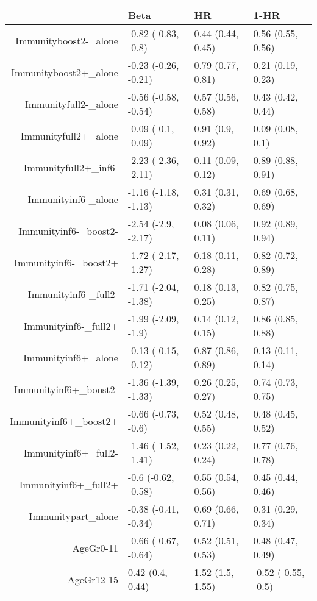 \begin{table}[ht]
\centering
\begin{tabular}{rlll}
  \hline
 & Beta & HR & 1-HR \\ 
  \hline
Immunityboost2-\_alone & -0.82 (-0.83, -0.8) & 0.44 (0.44, 0.45) & 0.56 (0.55, 0.56) \\ 
  Immunityboost2+\_alone & -0.23 (-0.26, -0.21) & 0.79 (0.77, 0.81) & 0.21 (0.19, 0.23) \\ 
  Immunityfull2-\_alone & -0.56 (-0.58, -0.54) & 0.57 (0.56, 0.58) & 0.43 (0.42, 0.44) \\ 
  Immunityfull2+\_alone & -0.09 (-0.1, -0.09) & 0.91 (0.9, 0.92) & 0.09 (0.08, 0.1) \\ 
  Immunityfull2+\_inf6- & -2.23 (-2.36, -2.11) & 0.11 (0.09, 0.12) & 0.89 (0.88, 0.91) \\ 
  Immunityinf6-\_alone & -1.16 (-1.18, -1.13) & 0.31 (0.31, 0.32) & 0.69 (0.68, 0.69) \\ 
  Immunityinf6-\_boost2- & -2.54 (-2.9, -2.17) & 0.08 (0.06, 0.11) & 0.92 (0.89, 0.94) \\ 
  Immunityinf6-\_boost2+ & -1.72 (-2.17, -1.27) & 0.18 (0.11, 0.28) & 0.82 (0.72, 0.89) \\ 
  Immunityinf6-\_full2- & -1.71 (-2.04, -1.38) & 0.18 (0.13, 0.25) & 0.82 (0.75, 0.87) \\ 
  Immunityinf6-\_full2+ & -1.99 (-2.09, -1.9) & 0.14 (0.12, 0.15) & 0.86 (0.85, 0.88) \\ 
  Immunityinf6+\_alone & -0.13 (-0.15, -0.12) & 0.87 (0.86, 0.89) & 0.13 (0.11, 0.14) \\ 
  Immunityinf6+\_boost2- & -1.36 (-1.39, -1.33) & 0.26 (0.25, 0.27) & 0.74 (0.73, 0.75) \\ 
  Immunityinf6+\_boost2+ & -0.66 (-0.73, -0.6) & 0.52 (0.48, 0.55) & 0.48 (0.45, 0.52) \\ 
  Immunityinf6+\_full2- & -1.46 (-1.52, -1.41) & 0.23 (0.22, 0.24) & 0.77 (0.76, 0.78) \\ 
  Immunityinf6+\_full2+ & -0.6 (-0.62, -0.58) & 0.55 (0.54, 0.56) & 0.45 (0.44, 0.46) \\ 
  Immunitypart\_alone & -0.38 (-0.41, -0.34) & 0.69 (0.66, 0.71) & 0.31 (0.29, 0.34) \\ 
  AgeGr0-11 & -0.66 (-0.67, -0.64) & 0.52 (0.51, 0.53) & 0.48 (0.47, 0.49) \\ 
  AgeGr12-15 & 0.42 (0.4, 0.44) & 1.52 (1.5, 1.55) & -0.52 (-0.55, -0.5) \\ 

\end{tabular}
\end{table}
